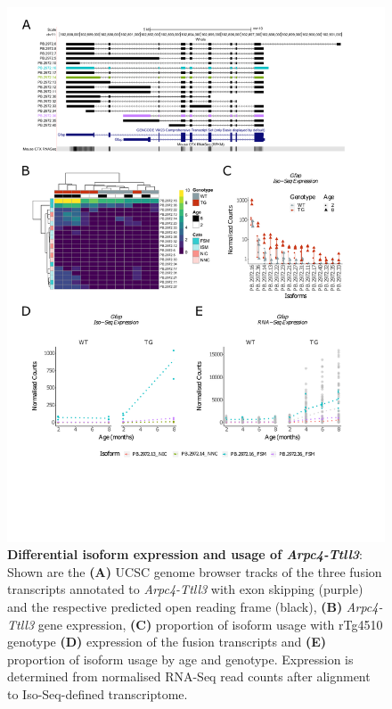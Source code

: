\begin{figure}[!htp]
	\centering
	\includegraphics[page=7,trim={1.5cm 1.5cm 2cm 1cm}, scale = 0.80]{Figures/Ch5_DiffPlots.pdf}
	\captionsetup{width=0.95\textwidth}
	\caption[Differential isoform expression and usage of \textit{Arpc4-Ttll3}]%
	{\textbf{Differential isoform expression and usage of \textit{Arpc4-Ttll3}}: Shown are the \textbf{(A)} UCSC genome browser tracks of the three fusion transcripts annotated to \textit{Arpc4-Ttll3} with exon skipping (purple) and the respective predicted open reading frame (black), \textbf{(B)} \textit{Arpc4-Ttll3} gene expression, \textbf{(C)} proportion of isoform usage with rTg4510 genotype \textbf{(D)} expression of the fusion transcripts and \textbf{(E)} proportion of isoform usage by age and genotype. Expression is determined from normalised RNA-Seq read counts after alignment to Iso-Seq-defined transcriptome.} 
	\label{fig:DIU_Arpc4}
\end{figure}





